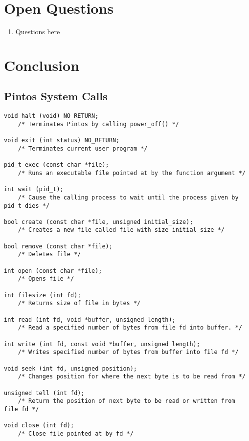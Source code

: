 \documentclass[11pt, letterpaper]{article}
\begin{document}
\section*{Open Questions}

\begin{enumerate}
\item Questions here
\end{enumerate}



\section*{Conclusion}

\pagebreak
\begin{appendices}

\section{Pintos System Calls}
\begin{lstlisting}[frame=single,basicstyle=\footnotesize]
void halt (void) NO_RETURN;
	/* Terminates Pintos by calling power_off() */
	
void exit (int status) NO_RETURN;
	/* Terminates current user program */

pid_t exec (const char *file);
	/* Runs an executable file pointed at by the function argument */

int wait (pid_t);
	/* Cause the calling process to wait until the process given by pid_t dies */

bool create (const char *file, unsigned initial_size);
	/* Creates a new file called file with size initial_size */

bool remove (const char *file);
	/* Deletes file */

int open (const char *file);
	/* Opens file */

int filesize (int fd);
	/* Returns size of file in bytes */

int read (int fd, void *buffer, unsigned length);
	/* Read a specified number of bytes from file fd into buffer. */

int write (int fd, const void *buffer, unsigned length);
	/* Writes specified number of bytes from buffer into file fd */

void seek (int fd, unsigned position);
	/* Changes position for where the next byte is to be read from */

unsigned tell (int fd);
	/* Return the position of next byte to be read or written from file fd */

void close (int fd);
	/* Close file pointed at by fd */

\end{lstlisting}

\pagebreak

%

\end{appendices}
\end{document}
